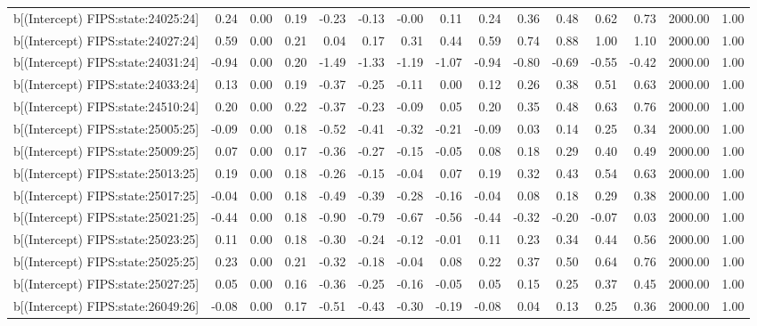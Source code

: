 \begin{table}[ht]
\begin{tabular}{rrrrrrrrrrrrrrr}
  b[(Intercept) FIPS:state:24025:24] & 0.24 & 0.00 & 0.19 & -0.23 & -0.13 & -0.00 & 0.11 & 0.24 & 0.36 & 0.48 & 0.62 & 0.73 & 2000.00 & 1.00 \\ 
  b[(Intercept) FIPS:state:24027:24] & 0.59 & 0.00 & 0.21 & 0.04 & 0.17 & 0.31 & 0.44 & 0.59 & 0.74 & 0.88 & 1.00 & 1.10 & 2000.00 & 1.00 \\ 
  b[(Intercept) FIPS:state:24031:24] & -0.94 & 0.00 & 0.20 & -1.49 & -1.33 & -1.19 & -1.07 & -0.94 & -0.80 & -0.69 & -0.55 & -0.42 & 2000.00 & 1.00 \\ 
  b[(Intercept) FIPS:state:24033:24] & 0.13 & 0.00 & 0.19 & -0.37 & -0.25 & -0.11 & 0.00 & 0.12 & 0.26 & 0.38 & 0.51 & 0.63 & 2000.00 & 1.00 \\ 
  b[(Intercept) FIPS:state:24510:24] & 0.20 & 0.00 & 0.22 & -0.37 & -0.23 & -0.09 & 0.05 & 0.20 & 0.35 & 0.48 & 0.63 & 0.76 & 2000.00 & 1.00 \\ 
  b[(Intercept) FIPS:state:25005:25] & -0.09 & 0.00 & 0.18 & -0.52 & -0.41 & -0.32 & -0.21 & -0.09 & 0.03 & 0.14 & 0.25 & 0.34 & 2000.00 & 1.00 \\ 
  b[(Intercept) FIPS:state:25009:25] & 0.07 & 0.00 & 0.17 & -0.36 & -0.27 & -0.15 & -0.05 & 0.08 & 0.18 & 0.29 & 0.40 & 0.49 & 2000.00 & 1.00 \\ 
  b[(Intercept) FIPS:state:25013:25] & 0.19 & 0.00 & 0.18 & -0.26 & -0.15 & -0.04 & 0.07 & 0.19 & 0.32 & 0.43 & 0.54 & 0.63 & 2000.00 & 1.00 \\ 
  b[(Intercept) FIPS:state:25017:25] & -0.04 & 0.00 & 0.18 & -0.49 & -0.39 & -0.28 & -0.16 & -0.04 & 0.08 & 0.18 & 0.29 & 0.38 & 2000.00 & 1.00 \\ 
  b[(Intercept) FIPS:state:25021:25] & -0.44 & 0.00 & 0.18 & -0.90 & -0.79 & -0.67 & -0.56 & -0.44 & -0.32 & -0.20 & -0.07 & 0.03 & 2000.00 & 1.00 \\ 
  b[(Intercept) FIPS:state:25023:25] & 0.11 & 0.00 & 0.18 & -0.30 & -0.24 & -0.12 & -0.01 & 0.11 & 0.23 & 0.34 & 0.44 & 0.56 & 2000.00 & 1.00 \\ 
  b[(Intercept) FIPS:state:25025:25] & 0.23 & 0.00 & 0.21 & -0.32 & -0.18 & -0.04 & 0.08 & 0.22 & 0.37 & 0.50 & 0.64 & 0.76 & 2000.00 & 1.00 \\ 
  b[(Intercept) FIPS:state:25027:25] & 0.05 & 0.00 & 0.16 & -0.36 & -0.25 & -0.16 & -0.05 & 0.05 & 0.15 & 0.25 & 0.37 & 0.45 & 2000.00 & 1.00 \\ 
  b[(Intercept) FIPS:state:26049:26] & -0.08 & 0.00 & 0.17 & -0.51 & -0.43 & -0.30 & -0.19 & -0.08 & 0.04 & 0.13 & 0.25 & 0.36 & 2000.00 & 1.00 \\ 

\end{tabular}
\end{table}
